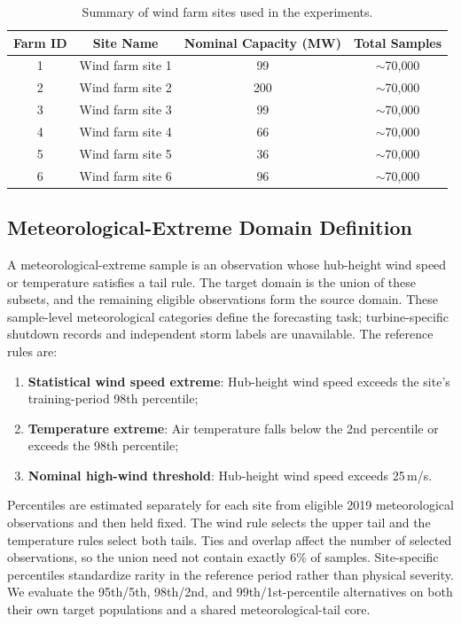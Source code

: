 \documentclass[a4paper]{cas-sc}
\begin{document}
\begin{table}[pos=ht]
\centering
\caption{Summary of wind farm sites used in the experiments.}
\setlength{\tabcolsep}{4mm}
\begin{tabular}{cccc}
\toprule
Farm ID & Site Name & Nominal Capacity (MW) & Total Samples \\
\midrule
1 & Wind farm site 1 & 99  & $\sim$70{,}000 \\
2 & Wind farm site 2 & 200 & $\sim$70{,}000 \\
3 & Wind farm site 3 & 99  & $\sim$70{,}000 \\
4 & Wind farm site 4 & 66  & $\sim$70{,}000 \\
5 & Wind farm site 5 & 36  & $\sim$70{,}000 \\
6 & Wind farm site 6 & 96  & $\sim$70{,}000 \\
\bottomrule
\end{tabular}
\label{tab:farm_summary}
\end{table}

\subsection{Meteorological-Extreme Domain Definition}\label{sec:extreme_def}

{\color{blue}A meteorological-extreme sample is an observation whose hub-height wind speed or temperature satisfies a tail rule. The target domain is the union of these subsets, and the remaining eligible observations form the source domain. These sample-level meteorological categories define the forecasting task; turbine-specific shutdown records and independent storm labels are unavailable. The reference rules are:}

\begin{enumerate}
    \item \textbf{Statistical wind speed extreme}: {\color{blue}Hub-height wind speed exceeds the site's training-period 98th percentile;}
    \item \textbf{Temperature extreme}: Air temperature falls below the 2nd percentile or exceeds the 98th percentile;
    \item {\color{blue}\textbf{Nominal high-wind threshold}: Hub-height wind speed exceeds 25\,m/s.}
\end{enumerate}

{\color{blue}Percentiles are estimated separately for each site from eligible 2019 meteorological observations and then held fixed. The wind rule selects the upper tail and the temperature rules select both tails. Ties and overlap affect the number of selected observations, so the union need not contain exactly 6\% of samples. Site-specific percentiles standardize rarity in the reference period rather than physical severity. We evaluate the 95th/5th, 98th/2nd, and 99th/1st-percentile alternatives on both their own target populations and a shared meteorological-tail core.}
\end{document}

